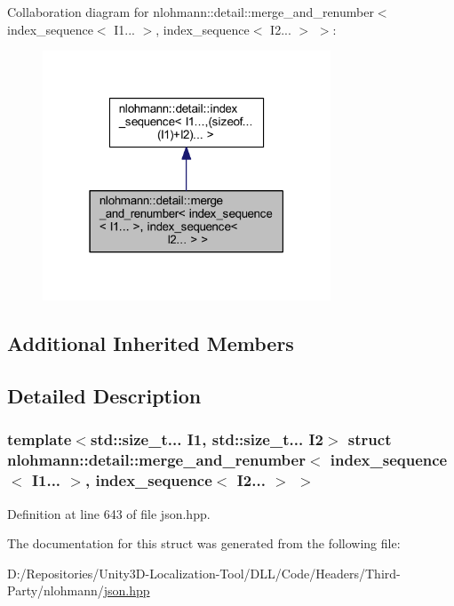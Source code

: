 Collaboration diagram for nlohmann\+::detail\+::merge\+\_\+and\+\_\+renumber$<$ index\+\_\+sequence$<$ I1... $>$, index\+\_\+sequence$<$ I2... $>$ $>$\+:
\nopagebreak
\begin{figure}[H]
\begin{center}
\leavevmode
\includegraphics[width=243pt]{structnlohmann_1_1detail_1_1merge__and__renumber_3_01index__sequence_3_01_i1_8_8_8_01_4_00_01ind7f3f7d0d4c10bc1f158de4a327478fcd}
\end{center}
\end{figure}
\subsection*{Additional Inherited Members}


\subsection{Detailed Description}
\subsubsection*{template$<$std\+::size\+\_\+t... I1, std\+::size\+\_\+t... I2$>$\newline
struct nlohmann\+::detail\+::merge\+\_\+and\+\_\+renumber$<$ index\+\_\+sequence$<$ I1... $>$, index\+\_\+sequence$<$ I2... $>$ $>$}



Definition at line 643 of file json.\+hpp.



The documentation for this struct was generated from the following file\+:\begin{DoxyCompactItemize}
\item 
D\+:/\+Repositories/\+Unity3\+D-\/\+Localization-\/\+Tool/\+D\+L\+L/\+Code/\+Headers/\+Third-\/\+Party/nlohmann/\mbox{\hyperlink{json_8hpp}{json.\+hpp}}\end{DoxyCompactItemize}
